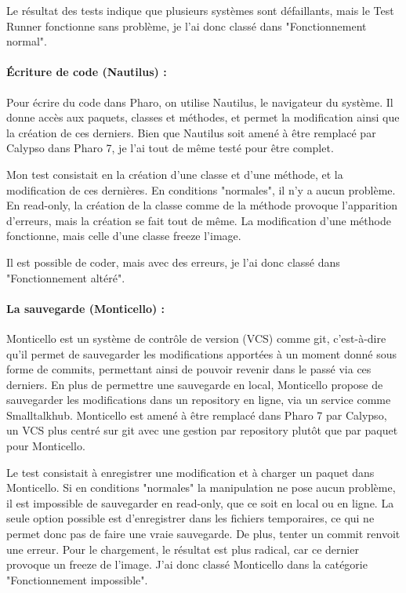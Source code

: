 Le résultat des tests indique que plusieurs systèmes sont défaillants, mais le Test Runner fonctionne sans problème, je l'ai donc classé dans "Fonctionnement normal".

\paragraph{Écriture de code (Nautilus) :}
Pour écrire du code dans Pharo, on utilise Nautilus, le navigateur du système. Il donne accès aux paquets, classes et méthodes, et permet la modification ainsi que la création de ces derniers. Bien que Nautilus soit amené à être remplacé par Calypso dans Pharo 7, je l'ai tout de même testé pour être complet.

Mon test consistait en la création d'une classe et d'une méthode, et la modification de ces dernières. En conditions "normales", il n'y a aucun problème. En read-only, la création de la classe comme de la méthode provoque l'apparition d'erreurs, mais la création se fait tout de même. La modification d'une méthode fonctionne, mais celle d'une classe freeze l'image.

Il est possible de coder, mais avec des erreurs, je l'ai donc classé dans "Fonctionnement altéré".

\paragraph{La sauvegarde (Monticello) :}
Monticello est un système de contrôle de version (VCS) comme git, c'est-à-dire qu'il permet de sauvegarder les modifications apportées à un moment donné sous forme de commits, permettant ainsi de pouvoir revenir dans le passé via ces derniers. En plus de permettre une sauvegarde en local, Monticello propose de sauvegarder les modifications dans un repository en ligne, via un service comme Smalltalkhub. Monticello est amené à être remplacé dans Pharo 7 par Calypso, un VCS plus centré sur git avec une gestion par repository plutôt que par paquet pour Monticello.

Le test consistait à enregistrer une modification et à charger un paquet dans Monticello. Si en conditions "normales" la manipulation ne pose aucun problème, il est impossible de sauvegarder en read-only, que ce soit en local ou en ligne. La seule option possible est d'enregistrer dans les fichiers temporaires, ce qui ne permet donc pas de faire une vraie sauvegarde. De plus, tenter un commit renvoit une erreur. Pour le chargement, le résultat est plus radical, car ce dernier provoque un freeze de l'image. J'ai donc classé Monticello dans la catégorie "Fonctionnement impossible".

